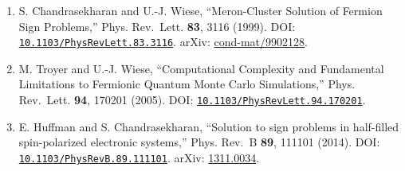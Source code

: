 \documentclass[
  11pt,
]{article}
\providecommand{\tightlist}{%
  \setlength{\itemsep}{0pt}\setlength{\parskip}{0pt}}
\begin{document}
\begin{enumerate}
\def\labelenumi{\arabic{enumi}.}
\tightlist
\item
  S. Chandrasekharan and U.-J. Wiese, ``Meron-Cluster Solution of
  Fermion Sign Problems,'' Phys. Rev.~Lett. \textbf{83}, 3116 (1999).
  DOI:
  \href{https://doi.org/10.1103/PhysRevLett.83.3116}{\nolinkurl{10.1103/PhysRevLett.83.3116}}.
  arXiv:
  \href{https://arxiv.org/abs/cond-mat/9902128}{cond-mat/9902128}.
\item
  M. Troyer and U.-J. Wiese, ``Computational Complexity and Fundamental
  Limitations to Fermionic Quantum Monte Carlo Simulations,'' Phys.
  Rev.~Lett. \textbf{94}, 170201 (2005). DOI:
  \href{https://doi.org/10.1103/PhysRevLett.94.170201}{\nolinkurl{10.1103/PhysRevLett.94.170201}}.
\item
  E. Huffman and S. Chandrasekharan, ``Solution to sign problems in
  half-filled spin-polarized electronic systems,'' Phys. Rev.~B
  \textbf{89}, 111101 (2014). DOI:
  \href{https://doi.org/10.1103/PhysRevB.89.111101}{\nolinkurl{10.1103/PhysRevB.89.111101}}.
  arXiv: \href{https://arxiv.org/abs/1311.0034}{1311.0034}.
\end{enumerate}
\end{document}

